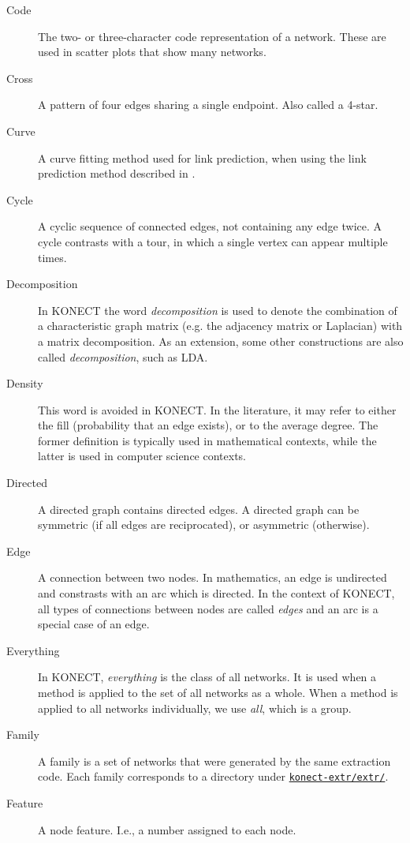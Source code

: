 \documentclass{article}
\begin{document}
\begin{description}
  \item[Code]
    The two- or three-character code representation of a network.  These
    are used in scatter plots that show many networks.  
  \item[Cross]
    A pattern of four edges sharing a single endpoint.  Also called a
    4-star.  
  \item[Curve]
    A curve fitting method used for link prediction, when using the link
    prediction method described
    in \citep{kunegis:spectral-transformation}.
  \item[Cycle] 
    A cyclic sequence of connected edges, not containing any edge twice.
    A cycle contrasts with a tour, in which a single vertex can appear
    multiple times.  
  \item[Decomposition] In KONECT the word \emph{decomposition} is used
    to denote the combination of a characteristic graph matrix (e.g. the
    adjacency matrix or Laplacian) with a matrix decomposition.  As an
    extension, some other constructions are also called
    \emph{decomposition}, such as LDA.
  \item[Density] This word is avoided in KONECT.  In the literature, it
    may refer to either the fill (probability that an edge exists), or to
    the average degree.  The former definition is typically used in mathematical
    contexts, while the latter is used in computer science contexts.
  \item[Directed] A directed graph contains directed edges.  A directed
    graph can be symmetric (if all edges are reciprocated), or
    asymmetric (otherwise). 
  \item[Edge] A connection between two nodes.  In mathematics, an edge
    is undirected and constrasts with an arc which is directed.  In the
    context of KONECT, all types of connections between nodes are called
    \emph{edges} and an arc is a special case of an edge. 
  \item[Everything] In KONECT, \emph{everything} is the class of all
    networks.  It is used when a method is applied to the set of all
    networks as a whole.  When a method is applied to all networks
    individually, we use \emph{all}, which is a group. 
  \item[Family] A family is a set of networks that were generated by the
    same extraction code.  Each family corresponds to a directory under \href{https://github.com/kunegis/konect-extr/tree/master/extr}{\texttt{konect-extr/extr/}}.
  \item[Feature] A node feature. I.e., a number assigned to each node.

\end{description}
\end{document}
